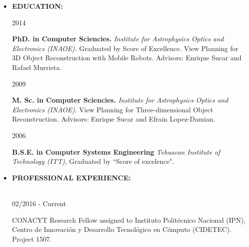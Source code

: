 \documentclass[10pt]{article}
\begin{document}
\begin{itemize}
	

	
\item{\bf EDUCATION:}

\begin{minipage}{1.5 in}
	2014\\
\end{minipage}
\begin{minipage}{4.5in}
	\textbf{PhD. in Computer Sciencies.} \textit{Institute for Astrophysics Optics and
	Electronics (INAOE).} Graduated by Score of Excellence. View Planning for 3D Object Reconstruction with Mobile Robots. Advisors: Enrique Sucar and Rafael Murrieta.\\ 
\end{minipage}

\begin{minipage}{1.5 in}
	2009\\
\end{minipage}
\begin{minipage}{4.5in}
	\textbf{M. Sc. in Computer Sciencies.} \textit{Institute for Astrophysics Optics and
		Electronics (INAOE).} View Planning for Three-dimensional Object Reconstruction. Advisors: Enrique Sucar and Efrain Lopez-Damian.\\ 
\end{minipage}

\begin{minipage}{1.5 in}
	2006\\
\end{minipage}
\begin{minipage}{4.5in}
	\textbf{B.S.E. in Computer Systems Engineering} \textit{Tehuacan Institute of Technology (ITT)}, Graduated by ``Score of excelence".\\ 
\end{minipage}

\item {\bf PROFESSIONAL EXPERIENCE:} \\\\

\begin{minipage}{1.5 in}
	02/2016 - Current\\
\end{minipage}
\begin{minipage}{4.5in}
	CONACYT Research Fellow assigned to Instituto Politécnico Nacional (IPN), Centro de Innovación y Desarrollo Tecnológico en Cómputo (CIDETEC). Project 1507.\\ 
\end{minipage}


\end{itemize}
\end{document}
